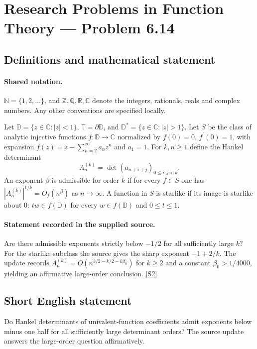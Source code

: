 \documentclass[11pt]{book}
\newcommand{\sref}[2]{\hyperlink{source:#1:#2}{[S#2]}}
\begin{document}
\section{Research Problems in Function Theory — Problem 6.14}\label{statement}

\subsection{Definitions and mathematical statement}

\paragraph{Shared notation.}$\mathbb N=\{1,2,\ldots\}$, and $\mathbb Z,\mathbb Q,\mathbb R,\mathbb C$ denote the integers, rationals, reals and complex numbers. Any other conventions are specified locally.


Let $\mathbb D=\{z\in\mathbb C:|z|<1\}$, $\mathbb T=\partial\mathbb D$, and $\mathbb D^*=\{z\in\mathbb C:|z|>1\}$. Let $S$ be the class of analytic injective functions $f:\mathbb D\to\mathbb C$ normalized by $f(0)=0$, $f^{\prime}(0)=1$, with expansion $f(z)=z+\sum_{n=2}^{\infty}a_nz^n$ and $a_1=1$. For $k,n\ge1$ define the Hankel determinant \[A_n^{(k)}=\det(a_{n+i+j})_{0\le i,j<k}.\] An exponent $\beta$ is admissible for order $k$ if for every $f\in S$ one has $|A_n^{(k)}|^{1/k}=O_f(n^{\beta})$ as $n\to\infty$. A function in $S$ is starlike if its image is starlike about $0$: $tw\in f(\mathbb D)$ for every $w\in f(\mathbb D)$ and $0\le t\le1$.
\paragraph{Statement recorded in the supplied source.}
Are there admissible exponents strictly below $-1/2$ for all sufficiently large $k$? For the starlike subclass the source gives the sharp exponent $-1+2/k$. The update records $A_n^{(k)}=O(n^{3/2-k/2-k\beta_0})$ for $k\ge2$ and a constant $\beta_0>1/4000$, yielding an affirmative large-order conclusion. \sref{statement}{2}
\subsection{Short English statement}
Do Hankel determinants of univalent-function coefficients admit exponents below minus one half for all sufficiently large determinant orders? The source update answers the large-order question affirmatively.
\end{document}
